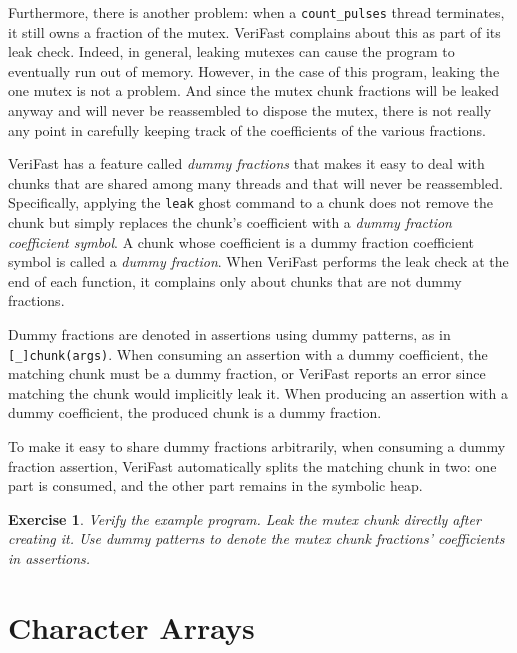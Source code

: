 \documentclass{article}
\newtheorem{exercise}{Exercise}
\begin{document}
Furthermore, there is another problem: when a
\lstinline!count_pulses! thread terminates, it still owns a
fraction of the mutex. VeriFast complains about this as part of
its leak check. Indeed, in general, leaking mutexes can cause
the program to eventually run out of memory. However, in the
case of this program, leaking the one mutex is not a problem.
And since the mutex chunk fractions will be leaked anyway and
will never be reassembled to dispose the mutex, there is not
really any point in carefully keeping track of the coefficients
of the various fractions.

VeriFast has a feature called \emph{dummy fractions} that makes
it easy to deal with chunks that are shared among many threads
and that will never be reassembled. Specifically, applying the
\lstinline!leak! ghost command to a chunk does not remove the
chunk but simply replaces the chunk's coefficient with a
\emph{dummy fraction coefficient symbol}. A chunk whose
coefficient is a dummy fraction coefficient symbol is called a
\emph{dummy fraction}. When VeriFast performs the leak check at
the end of each function, it complains only about chunks that
are not dummy fractions.

Dummy fractions are denoted in assertions using dummy patterns,
as in \lstinline![_]chunk(args)!. When consuming an assertion
with a dummy coefficient, the matching chunk must be a dummy
fraction, or VeriFast reports an error since matching the chunk
would implicitly leak it. When producing an assertion with a
dummy coefficient, the produced chunk is a dummy fraction.

To make it easy to share dummy fractions arbitrarily, when
consuming a dummy fraction assertion, VeriFast automatically
splits the matching chunk in two: one part is consumed, and the
other part remains in the symbolic heap.

\begin{exercise}\label{exercise:leaking}
Verify the example program. Leak the mutex chunk directly after
creating it. Use dummy patterns to denote the mutex chunk
fractions' coefficients in assertions.
\end{exercise}

\section{Character Arrays}\label{section:arrays}
\end{document}
